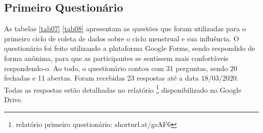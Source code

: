 \subsection{Primeiro Questionário}

As tabelas \ref{tab07} \ref{tab08} apresentam as questões que foram utilizadas para o primeiro ciclo de coleta de dados sobre o ciclo menstrual e 
sua influência. O questionário foi feito utilizando a plataforma Google Forms, sendo respondido de forma anônima, para que as
participantes se sentissem mais confortáveis respondendo-o. Ao todo, o questionário contou com 31 perguntas, sendo 20 fechadas e 
11 abertas. Foram recebidas 23 respostas até a data 18/03/2020. Todas as respostas estão 
detalhadas no relatório \footnote{relatório primeiro questionário: shorturl.at/gsAF6 } disponibilizado no Google Drive.


